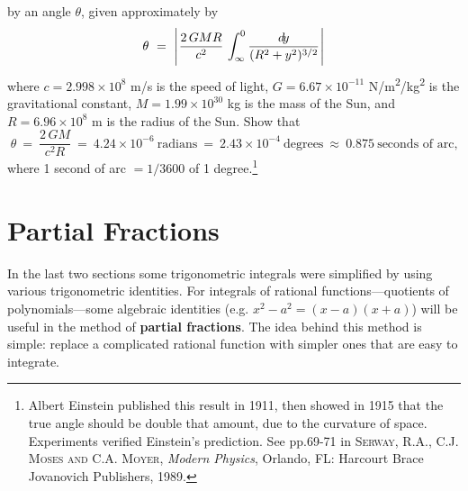 {\begin{enumerate}[\bfseries 1.]
  by an angle $\theta$, given approximately by
\[
\theta ~=~ \Biggl\lvert\mspace{1mu}\frac{2\,GMR}{c^2}\,\int_{\infty}^0 \frac{d\!y}{(R^2 + y^2)^{3/2}}\mspace{1mu}\Biggr\rvert
\]
where $c= 2.998 \times 10^8$ m/s is the speed of light,
$G = 6.67 \times 10^{-11}$ N/m\textsuperscript{2}/kg\textsuperscript{2} is the
gravitational constant, $M = 1.99 \times 10^{30}$ kg is the mass of the Sun, and
$R = 6.96 \times 10^{8}$ m is the radius of the Sun. Show that
\[
\theta ~=~ \frac{2\,GM}{c^2 R} ~=~ 4.24 \times 10^{-6}~\text{radians}
~=~ 2.43 \times 10^{-4}~\text{degrees} ~\approx~ 0.875~\text{seconds of arc,}
\]
where 1 second of arc $= 1/3600$ of 1 degree.\footnote{Albert Einstein published
this result in 1911, then showed in 1915 that the true angle should be double
that amount, due to the curvature of space. Experiments verified Einstein's
prediction. See pp.69-71 in \textsc{Serway, R.A., C.J. Moses and C.A. Moyer},
\emph{Modern Physics}, Orlando, FL: Harcourt Brace Jovanovich Publishers, 1989.}
\end{enumerate}
}
\newpage
\section{Partial Fractions}
In the last two sections some trigonometric integrals were
simplified by using various trigonometric identities. For integrals of rational
functions---quotients of polynomials---some algebraic identities
(e.g. $x^2 - a^2 = (x-a)(x+a)$) will be useful in the method of
\textbf{partial fractions}. The idea behind this method
is simple: replace a complicated rational function with simpler ones that are
easy to integrate.

